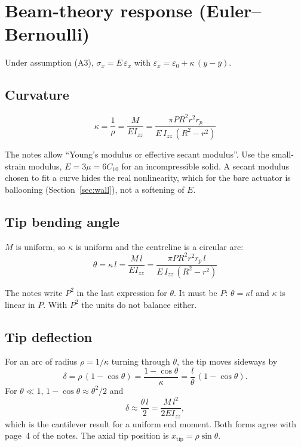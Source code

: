\documentclass[11pt,a4paper]{article}
\numberwithin{equation}{section}
\newcommand{\Izz}{I_{zz}}
\newcommand{\rp}{r_p}
\begin{document}
\section{Beam-theory response (Euler--Bernoulli)}\label{sec:beam}

Under assumption (A3), $\sigma_x = E\,\varepsilon_x$ with $\varepsilon_x = \varepsilon_0 + \kappa\,(y-\bar y)$.

\subsection{Curvature}
\begin{equation}
\boxed{\;\kappa = \frac{1}{\rho} = \frac{M}{E\Izz} = \frac{\pi P R^2 r^2 \rp}{E\,\Izz\,(R^2-r^2)}\;} \label{eq:kappa}
\end{equation}

\begin{correction}
The notes allow ``Young's modulus or effective secant modulus''. Use the small-strain modulus, $E = 3\mu = 6C_{10}$ for an
incompressible solid. A secant modulus chosen to fit a curve hides the real nonlinearity, which for the bare actuator is ballooning
(Section~\ref{sec:wall}), not a softening of $E$.
\end{correction}

\subsection{Tip bending angle}
$M$ is uniform, so $\kappa$ is uniform and the centreline is a circular arc:
\begin{equation}
\boxed{\;\theta = \kappa\,l = \frac{M\,l}{E\Izz} = \frac{\pi P R^2 r^2 \rp\, l}{E\,\Izz\,(R^2-r^2)}\;} \label{eq:theta}
\end{equation}

\begin{correction}
The notes write $P^2$ in the last expression for $\theta$. It must be $P$: $\theta=\kappa l$ and $\kappa$ is linear in $P$.
With $P^2$ the units do not balance either.
\end{correction}

\subsection{Tip deflection}
For an arc of radius $\rho=1/\kappa$ turning through $\theta$, the tip moves sideways by
\begin{equation}
\delta = \rho\,(1-\cos\theta) = \frac{1-\cos\theta}{\kappa} = \frac{l}{\theta}\,(1-\cos\theta). \label{eq:delta-arc}
\end{equation}
For $\theta\ll 1$, $1-\cos\theta \approx \theta^2/2$ and
\begin{equation}
\delta \approx \frac{\theta\, l}{2} = \frac{M\,l^2}{2E\Izz}, \label{eq:delta-small}
\end{equation}
which is the cantilever result for a uniform end moment. Both forms agree with page~4 of the notes.
The axial tip position is $x_{\text{tip}} = \rho\sin\theta$.
\end{document}
